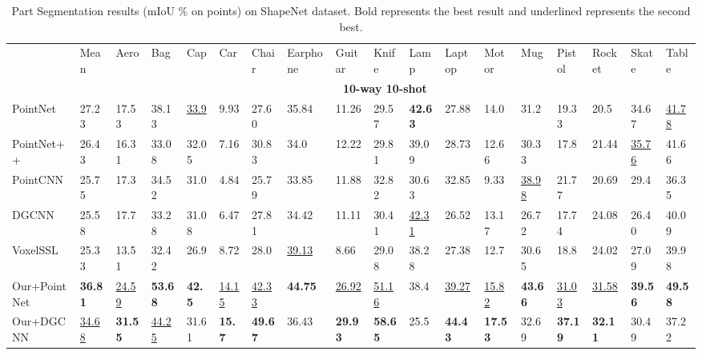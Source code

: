 \documentclass{article}
\begin{document}
\begin{table}[tbp]
	\caption{Part Segmentation results (mIoU \% on points) on ShapeNet dataset. Bold represents the best result and underlined represents the second best.}
	\label{part}
\tiny
	\setlength{\tabcolsep}{3.0pt}
	\begin{tabular}{llllllllllllllllll}
		\toprule
		
		&Mean&Aero&Bag&Cap&Car&Chair&Earphone&Guitar&Knife&Lamp&Laptop&Motor&Mug&Pistol&Rocket&Skate&Table\\
		
		\cmidrule(r){2-18}
		& \multicolumn{17}{c}{\textbf{10-way 10-shot}}\\
		\cmidrule(r){2-18}
PointNet &27.23 &17.53 &38.13 &\underline{33.9} &9.93 &27.60 &35.84 &11.26 &29.57 &\textbf{42.63} &27.88 &14.0 &31.2 &19.33 &20.5 &34.67 &\underline{41.78}\\ 
		PointNet++ &26.43 &16.31 &33.08 &32.05 &7.16 &30.83 &34.0 &12.22 &29.81 &39.09 &28.73 &12.66 &30.33 &17.8 &21.44 &\underline{35.76} &41.66\\
		PointCNN &25.75 &17.3 &34.52 &31.0 &4.84 &25.79 &33.85 &11.88 &32.82 &30.63 &32.85 &9.33 &\underline{38.98} &21.77 &20.69 &29.4 &36.35\\
		DGCNN &25.58 &17.7 &33.28 &31.08 &6.47 &27.81 &34.42 &11.11 &30.41 &\underline{42.31} &26.52 &13.17 &26.72 &17.74 &24.08 &26.40 &40.09\\ 
		
		VoxelSSL &25.33 &13.51 &32.42 &26.9 &8.72 &28.0 &\underline{39.13} &8.66 &29.08 &38.28 &27.38 &12.7 &30.65 &18.8 &24.02 &27.09 &39.98\\
		\midrule
		Our+PointNet &\textbf{36.81} &\underline{24.59} &\textbf{53.68} &\textbf{42.5} &\underline{14.15} &\underline{42.33} &\textbf{44.75} &\underline{26.92} &\underline{51.16} &38.4 &\underline{39.27} &\underline{15.82} &\textbf{43.66} &\underline{31.03} &\underline{31.58} &\textbf{39.56} &\textbf{49.58} \\
		Our+DGCNN  &\underline{34.68} &\textbf{31.55} &\underline{44.25} &31.61 &\textbf{15.7} &\textbf{49.67} &36.43 &\textbf{29.93} &\textbf{58.65} &25.5 &\textbf{44.43} &\textbf{17.53} &32.69 &\textbf{37.19} &\textbf{32.11} &30.49 &37.22\\ 
		
		\bottomrule
	\end{tabular}
\end{table}
\end{document}
